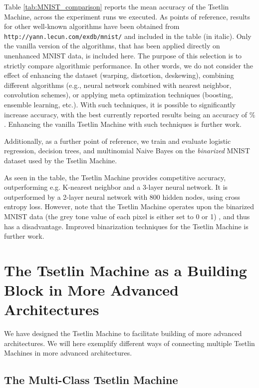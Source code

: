 \documentclass[11pt,a4paper]{article}
\begin{document}
Table \ref{tab:MNIST_comparison} reports the mean accuracy of the Tsetlin Machine, across the  experiment runs we executed. As points of reference, results for other well-known algorithms have been obtained from {\tt http://yann.lecun.com/exdb/mnist/} and included in the table (in italic). Only the vanilla version of the algorithms, that has been applied directly on unenhanced MNIST data, is included here. The purpose of this selection is to strictly compare algorithmic performance. In other words, we do not consider the effect of enhancing the dataset (warping, distortion, deskewing), combining different algorithms (e.g., neural network combined with nearest neighbor, convolution schemes), or applying meta optimization techniques (boosting, ensemble learning, etc.). With such techniques, it is possible to significantly increase accuracy, with the best currently reported results being an accuracy of \% \cite{Wan2013}. Enhancing the vanilla Tsetlin Machine with such techniques is further work.

Additionally, as a further point of reference, we train and evaluate logistic regression, decision trees, and multinomial Naive Bayes on the \emph{binarized} MNIST dataset used by the Tsetlin Machine.

As seen in the table, the Tsetlin Machine provides competitive accuracy, outperforming e.g. K-nearest neighbor and a 3-layer neural network. It is outperformed by a 2-layer neural network with 800 hidden nodes, using cross entropy loss. However, note that the Tsetlin Machine operates upon the binarized MNIST data (the grey tone value of each pixel is either set to 0 or 1) , and thus has a disadvantage. Improved binarization techniques for the Tsetlin Machine is further work.

\section{The Tsetlin Machine as a Building Block in More Advanced Architectures}
\label{sec:building_block}

We have designed the Tsetlin Machine to facilitate building of more advanced architectures. We will here exemplify different ways of connecting multiple Tsetlin Machines in more advanced architectures.

\subsection{The Multi-Class Tsetlin Machine}
\end{document}
